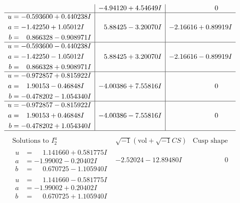 \documentclass[1p]{elsarticle_modified}
\theoremstyle{definition}
\newcommand{\I}{\sqrt{-1}}
\begin{document}
$$\begin{array}{c|c|c}
 & -4.94120 + 4.54649 I & \phantom{-0.000000 } 0 \\ \hline\begin{aligned}
u &= -0.593600 + 0.440238 I \\
a &= -1.42250 + 1.05012 I \\
b &= \phantom{-}0.866328 - 0.908971 I\end{aligned}
 & \phantom{-}5.88425 - 3.20070 I & -2.16616 + 0.89919 I \\ \hline\begin{aligned}
u &= -0.593600 - 0.440238 I \\
a &= -1.42250 - 1.05012 I \\
b &= \phantom{-}0.866328 + 0.908971 I\end{aligned}
 & \phantom{-}5.88425 + 3.20070 I & -2.16616 - 0.89919 I \\ \hline\begin{aligned}
u &= -0.972857 + 0.815922 I \\
a &= \phantom{-}1.90153 - 0.46848 I \\
b &= -0.478202 - 1.054340 I\end{aligned}
 & -4.00386 + 7.55816 I & \phantom{-0.000000 } 0 \\ \hline\begin{aligned}
u &= -0.972857 - 0.815922 I \\
a &= \phantom{-}1.90153 + 0.46848 I \\
b &= -0.478202 + 1.054340 I\end{aligned}
 & -4.00386 - 7.55816 I & \phantom{-0.000000 } 0\\
 \hline 
 \end{array}$$\newpage$$\begin{array}{c|c|c}  
\text{Solutions to }I^u_{2}& \I (\text{vol} + \sqrt{-1}CS) & \text{Cusp shape}\\
 \hline 
\begin{aligned}
u &= \phantom{-}1.141660 + 0.581775 I \\
a &= -1.99002 - 0.20402 I \\
b &= \phantom{-}0.670725 - 1.105940 I\end{aligned}
 & -2.52024 - 12.89480 I & \phantom{-0.000000 } 0 \\ \hline\begin{aligned}
u &= \phantom{-}1.141660 - 0.581775 I \\
a &= -1.99002 + 0.20402 I \\
b &= \phantom{-}0.670725 + 1.105940 I\end{aligned}

\end{array}$$
\end{document}

